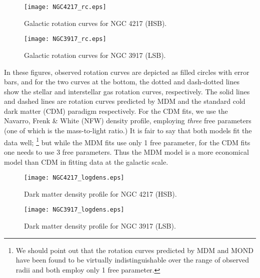\documentclass[a4paper]{jpconf}
\begin{document}


\begin{figure}[h]
\hspace{2pc}
\begin{minipage}{15pc}
\texttt{[image: NGC4217\_rc.eps]}
\caption{\label{Fig1}Galactic rotation curves for NGC 4217 (HSB).}
\end{minipage}\hspace{4pc}%
\begin{minipage}{15pc}
\texttt{[image: NGC3917\_rc.eps]}
\caption{\label{Fig2}Galactic rotation curves for NGC 3917 (LSB).}
\end{minipage} \end{figure}

\vspace{0.5cm}

 In these figures, observed rotation curves are depicted as filled circles with 
error bars, and for the two curves at the bottom, the dotted and dash-dotted 
lines show the stellar and interstellar gas rotation curves, respectively. The 
solid lines and dashed lines are rotation curves predicted by MDM and the 
standard cold dark matter (CDM) paradigm respectively. For the CDM fits, we use 
the Navarro, Frenk \& White (NFW) \cite{nfw} density profile, employing {\it 
three} free parameters (one of which is
the mass-to-light ratio.)  It is fair
to say that both models fit the data well; \footnote{We should point out that
the rotation curves predicted by MDM and MOND have been found \cite{Edm1} to be 
virtually indistinguishable
over the range of observed radii and both employ only 1 free parameter.}
but while the MDM fits use only 1 free parameter,
for the CDM fits one needs to use 3 free parameters.  Thus the MDM model is a 
more economical model than CDM in fitting data at the galactic scale.\\

\begin{figure}[h]
\hspace{2pc}
\begin{minipage}{15pc}
\texttt{[image: NGC4217\_logdens.eps]}
\caption{\label{Fig3}Dark matter density profile for NGC 4217 (HSB).}
\end{minipage}\hspace{4pc}%
\begin{minipage}{15pc}
\texttt{[image: NGC3917\_logdens.eps]}
\caption{\label{Fig4}Dark matter density profile for NGC 3917 (LSB).}
\end{minipage} \end{figure}
\end{document}
